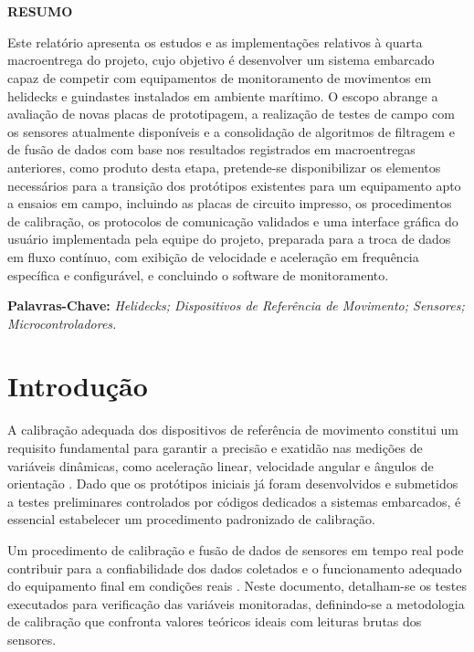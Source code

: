 \documentclass[a4paper, 12pt]{article}
\makeatletter
\renewcommand\tableofcontents{%
    \centering
    \section*{\contentsname
        \@mkboth{%
           \MakeUppercase\contentsname}{\MakeUppercase\contentsname}}%
    \@starttoc{toc}%
    }
\makeatother
\begin{document}

\pagestyle{modeloTexto}


\newpage
\tableofcontents
\newpage
\listoffigures
\newpage
\raggedright
\justifying
\normalsize


\newpage
\begin{center}
    \Large \textbf{RESUMO}
\end{center}

\noindent
Este relatório apresenta os estudos e as implementações relativos à quarta macroentrega do projeto, cujo objetivo é desenvolver um sistema embarcado capaz de competir com equipamentos de monitoramento de movimentos em helidecks e guindastes instalados em ambiente marítimo. O escopo abrange a avaliação de novas placas de prototipagem, a realização de testes de campo com os sensores atualmente disponíveis e a consolidação de algoritmos de filtragem e de fusão de dados com base nos resultados registrados em macroentregas anteriores, como produto desta etapa, pretende-se disponibilizar os elementos necessários para a transição dos protótipos existentes para um equipamento apto a ensaios em campo, incluindo as placas de circuito impresso, os procedimentos de calibração, os protocolos de comunicação validados e uma interface gráfica do usuário implementada pela equipe do projeto, preparada para a troca de dados em fluxo contínuo, com exibição de velocidade e aceleração em frequência específica e configurável, e concluindo o software de monitoramento.

\vspace{.15cm}
\noindent
\textbf{Palavras-Chave:} \textit{Helidecks; Dispositivos de Referência de Movimento; Sensores; Microcontroladores.}

\newpage
\section{Introdução}
    A calibração adequada dos dispositivos de referência de movimento constitui um requisito fundamental para garantir a precisão e exatidão nas medições de variáveis dinâmicas, como aceleração linear, velocidade angular e ângulos de orientação \cite{chao_cui_fcd63cb2}. Dado que os protótipos iniciais já foram desenvolvidos e submetidos a testes preliminares controlados por códigos dedicados a sistemas embarcados, é essencial estabelecer um procedimento padronizado de calibração.

    Um procedimento de calibração e fusão de dados de sensores em tempo real pode contribuir para a confiabilidade dos dados coletados e o funcionamento adequado do equipamento final em condições reais \cite{du_an_nemec_9f411383}. Neste documento, detalham-se os testes executados para verificação das variáveis monitoradas, definindo-se a metodologia de calibração que confronta valores teóricos ideais com leituras brutas dos sensores.
\end{document}
